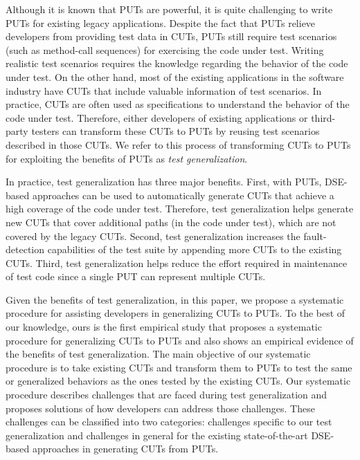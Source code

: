 Although it is known that PUTs are powerful, it is quite challenging to write PUTs for existing legacy applications. Despite the fact that PUTs relieve developers from providing test data in CUTs, PUTs still require test scenarios (such as method-call sequences) for exercising the code under test. Writing realistic test scenarios requires the knowledge regarding the behavior of the code under test. On the other hand, most of the existing applications in the software industry have CUTs that include valuable information of test scenarios. In practice, CUTs are often used as specifications to understand the behavior of the code under test. Therefore, either developers of existing applications or third-party testers can transform these CUTs to PUTs by reusing test scenarios described in those CUTs. We refer to this process of transforming CUTs to PUTs for exploiting the benefits of PUTs as \emph{test generalization}. %

In practice, test generalization has three major benefits. First, with PUTs, DSE-based approaches can be used to automatically generate CUTs that achieve a high coverage
of the code under test. Therefore, test generalization helps generate new CUTs that cover additional paths (in the code under test), which are not covered by the legacy CUTs. Second, test generalization increases the fault-detection capabilities of the test suite by appending more CUTs to the existing CUTs. Third, test generalization helps reduce the effort required in maintenance of test code since a single PUT can represent multiple CUTs. 

Given the benefits of test generalization, in this paper, we propose a systematic procedure for assisting developers in generalizing CUTs to PUTs. To the best of our knowledge, ours is the first empirical study that proposes a systematic procedure for generalizing CUTs to PUTs and also shows an empirical evidence of the benefits of test generalization. The main objective of our systematic procedure is to take existing CUTs and transform them to PUTs to test the same or generalized behaviors as the ones tested by the existing CUTs. Our systematic procedure describes challenges that are faced during test generalization and proposes solutions of how developers can address those challenges. These challenges can be classified into two categories: challenges specific to our test generalization and challenges in general for the existing state-of-the-art DSE-based approaches in generating CUTs from PUTs. 

